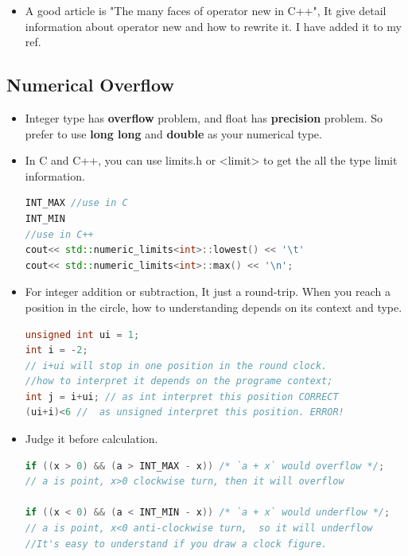 \documentclass[a4paper,12pt,twoside]{book}
\begin{document}
\begin{itemize}
\begin{lstlisting}[frame=single, language=c++]
p1->~FOO(); // call dtor directly,
p2->~FOO(); //don't call delete p1.

delete[] buffer;
\end{lstlisting}

\item A good article is "The many faces of operator new in C++", It give  detail information about operator new and how to rewrite it. I have added it to my ref.
\end{itemize}


\subsection{Numerical Overflow}

\begin{itemize}
\item Integer type has \textbf{overflow} problem, and float has \textbf{precision} problem. So prefer to use \textbf{long long} and \textbf{double} as your numerical type.
\item In C and C++, you can use limits.h or <limit> to get the all the type limit information.
\begin{lstlisting}[frame=single, language=c++]
INT_MAX //use in C
INT_MIN
//use in C++
cout<< std::numeric_limits<int>::lowest() << '\t'
cout<< std::numeric_limits<int>::max() << '\n';
\end{lstlisting}

\item For integer addition or subtraction, It just a round-trip. When you reach a position in the circle, how to understanding depends on its context and type.
\begin{lstlisting}[frame=single, language=c++]
unsigned int ui = 1;
int i = -2;
// i+ui will stop in one position in the round clock.
//how to interpret it depends on the programe context;
int j = i+ui; // as int interpret this position CORRECT
(ui+i)<6 //  as unsigned interpret this position. ERROR!
\end{lstlisting}

\item  Judge it before calculation.
\begin{lstlisting}[frame=single, language=c++]
if ((x > 0) && (a > INT_MAX - x)) /* `a + x` would overflow */;
// a is point, x>0 clockwise turn, then it will overflow

if ((x < 0) && (a < INT_MIN - x)) /* `a + x` would underflow */;
// a is point, x<0 anti-clockwise turn,  so it will underflow
//It's easy to understand if you draw a clock figure.


\end{lstlisting}
\end{itemize}
\end{document}
